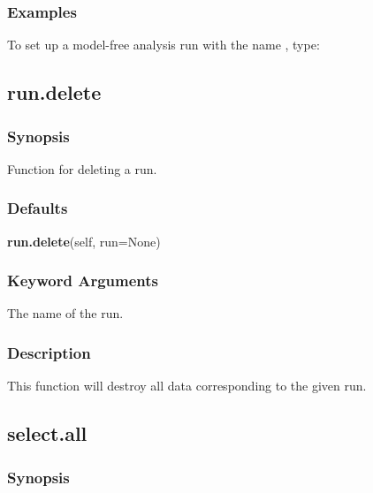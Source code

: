  
 \subsubsection{Examples} 

 To set up a model-free analysis run with the name , type: 
  


  

 \newpage 

 \subsection{run.delete} 

  
 \subsubsection{Synopsis} 

 Function for deleting a run. 
  

  
 \subsubsection{Defaults} 

 \textsf{\textbf{run.delete}(self, run=None)} 

  
 \subsubsection{Keyword Arguments} 

   The name of the run.  

  

  
 \subsubsection{Description} 

 This function will destroy all data corresponding to the given run. 
  

  

 \newpage 

 \subsection{select.all} 

  
 \subsubsection{Synopsis} 

